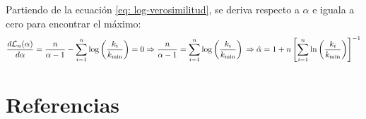 \documentclass{article}
\begin{document}
Partiendo de la ecuación \ref{eq: log-verosimilitud}, se deriva respecto a $\alpha$ e iguala a cero para encontrar el máximo:
$$
    \frac{d\mathcal{L}_n(\alpha)}{d\alpha} = \frac{n}{\alpha -1} - \sum_{i=1}^n \log \left(\frac{k_i}{k_\text{min}}\right) = 0 \\
    \Rightarrow \frac{n}{\alpha -1} = \sum_{i=1}^n \log \left(\frac{k_i}{k_\text{min}}\right) \\
    \Rightarrow \hat{\alpha} = 1 + n \left[ \sum_{i=1}^{n} \ln\left(\frac{k_i}{k_\text{min}}\right) \right]^{-1}
$$

\section{Referencias}


\end{document}
